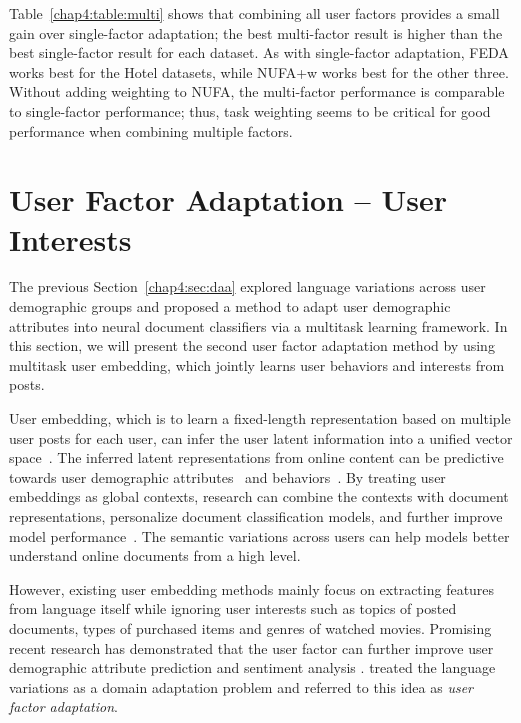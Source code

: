 Table~\ref{chap4:table:multi} shows that combining all user factors
provides a small gain over single-factor adaptation;
the best multi-factor result is higher than the best single-factor result for each dataset.
As with single-factor adaptation, FEDA works best for the Hotel datasets,
while NUFA+w works best for the other three.
Without adding weighting to NUFA, the multi-factor performance is comparable to single-factor performance;
thus, task weighting seems to be critical for good performance when combining multiple factors.


\section{User Factor Adaptation -- User Interests}
\label{chap4:sec:uemb}

The previous Section~\ref{chap4:sec:daa} explored language variations across user demographic groups and proposed a method to adapt user demographic attributes into neural document classifiers via a multitask learning framework.
In this section, we will present the second user factor adaptation method by using multitask user embedding, which jointly learns user behaviors and interests from posts.

User embedding, which is to learn a fixed-length representation based on multiple user posts for each user, can infer the user latent information into a unified vector space~\cite{benton2018learning, pan2019social}.
The inferred latent representations from online content can be predictive towards user demographic attributes~\cite{volkova2015inferring, wang2018cross, farnadi2018user, lynn2020hierarchical} and behaviors~\cite{amir2017quantifying, benton2017multitask, ding2017multi}.
By treating user embeddings as global contexts, research can combine the contexts with document representations, personalize document classification models, and further improve model performance~\cite{tang2015learning, chen2016neural, yang2017overcoming, wu2018improving, zeng2019joint, huang2019deep}.
The semantic variations across users can help models better understand online documents from a high level.

However, existing user embedding methods \cite{amir2016modelling, benton2016learning, xing2017incorporating, pan2019social} mainly focus on extracting features from language itself while ignoring user interests such as topics of posted documents, types of purchased items and genres of watched movies.
Promising recent research has demonstrated that the user factor can further improve user demographic attribute prediction \cite{farnadi2018user} and sentiment analysis \cite{yang2017overcoming}.
\cite{lynn2017human} treated the language variations as a domain adaptation problem and referred to this idea as \textit{user factor adaptation}.

